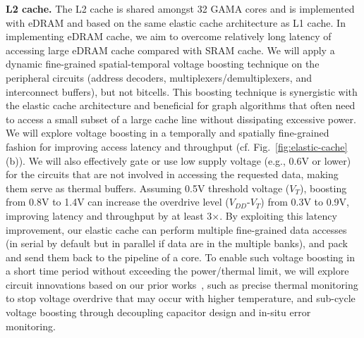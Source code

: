 \noindent
\textbf{L2 cache.}
The L2 cache is shared amongst 32 GAMA cores and is implemented with eDRAM and based on the same elastic cache architecture as L1 cache. 
In implementing eDRAM cache, we aim to overcome relatively long latency of accessing large eDRAM cache compared with SRAM cache. 
We will apply a dynamic fine-grained spatial-temporal voltage boosting technique on the peripheral circuits (address decoders, multiplexers/demultiplexers, and interconnect buffers), but not bitcells. 
This boosting technique is synergistic with the elastic cache architecture and beneficial for graph algorithms that often need to access a small subset of a large cache line without dissipating excessive power. 
We will explore voltage boosting in a temporally and spatially fine-grained fashion for improving access latency and throughput (cf. Fig.~\ref{fig:elastic-cache}(b)). 
We will also effectively gate or use low supply voltage (e.g., 0.6V or lower) for the circuits that are not involved in accessing the requested data, making them serve as thermal buffers. 
Assuming 0.5V threshold voltage ($V_T$), 
boosting from 0.8V to 1.4V can increase the overdrive level ($V_{DD}$-$V_T$) from 0.3V to 0.9V, 
improving latency and throughput by at least 3$\times$. 
By exploiting this latency improvement, our elastic cache can perform multiple fine-grained data accesses (in serial by default but in parallel if data are in the multiple banks), and pack and send them back to the pipeline of a core. 
To enable such voltage boosting in a short time period without exceeding the power/thermal limit, 
we will explore circuit innovations based on our prior works~\cite{yang2015compact,  Doyun2017, kim2014analysis}, such as precise thermal monitoring to stop voltage overdrive that may occur with higher temperature, and sub-cycle voltage boosting through decoupling capacitor design and in-situ error monitoring.


